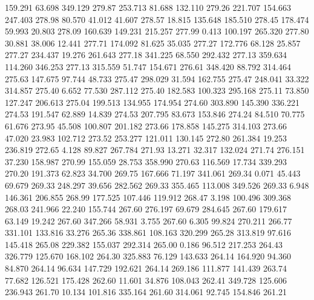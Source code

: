  159.291   63.698  349.129       279.87
 253.713   81.688  132.110       279.26
 221.707  154.663  247.403       278.98
  80.570   41.012   41.607       278.57
  18.815  135.648  185.510       278.45
 178.474   59.993   20.803       278.09
 160.639  149.231  215.257       277.99
   0.413  100.197  265.320       277.80
  30.881   38.006   12.441       277.71
 174.092   81.625   35.035       277.27
 172.776   68.128   25.857       277.27
 234.437   19.276  261.643       277.18
 341.225   68.550  292.432       277.13
 359.634  114.260  346.253       277.13
 315.559   51.747  154.671       276.61
 348.420   88.792  314.464       275.63
 147.675   97.744   48.733       275.47
 298.029   31.594  162.755       275.47
 248.041   33.322  314.857       275.40
   6.652   77.530  287.112       275.40
 182.583  100.323  295.168       275.11
  73.850  127.247  206.613       275.04
 199.513  134.955  174.954       274.60
 303.890  145.390  336.221       274.53
 191.547   62.889   14.839       274.53
 207.795   83.673  153.846       274.24
  84.510   70.775   61.676       273.95
  45.508  100.807  201.182       273.66
 178.858  145.275  314.103       273.66
  47.020   23.983  102.712       273.52
 253.277  121.011  130.145       272.80
 261.384   19.253  236.819       272.65
   4.128   89.827  267.784       271.93
  13.271   32.317  132.024       271.74
 276.151   37.230  158.987       270.99
 155.059   28.753  358.990       270.63
 116.569   17.734  339.293       270.20
 191.373   62.823   34.700       269.75
 167.666   71.197  341.061       269.34
   0.071   45.443   69.679       269.33
 248.297   39.656  282.562       269.33
 355.465  113.008  349.526       269.33
   6.948  146.361  206.855       268.99
 177.525  107.446  119.912       268.47
   3.198  100.496  309.368       268.03
 241.966   22.240  155.744       267.60
 276.197   69.679  284.645       267.60
 179.617   63.149   19.242       267.60
 347.266   58.931    3.755       267.60
   6.305   99.824  270.211       266.77
 331.101  133.816   33.276       265.36
 338.861  108.163  320.299       265.28
 313.819   97.616  145.418       265.08
 229.382  155.037  292.314       265.00
   0.186   96.512  217.253       264.43
 326.779  125.670  168.102       264.30
 325.883   76.129  143.633       264.14
 164.920   94.360   84.870       264.14
  96.634  147.729  192.621       264.14
 269.186  111.877  141.439       263.74
  77.682  126.521  175.428       262.60
  11.601   34.876  108.043       262.41
 349.728  125.606  236.943       261.70
  10.134  101.816  335.164       261.60
 314.061   92.745  154.846       261.21
